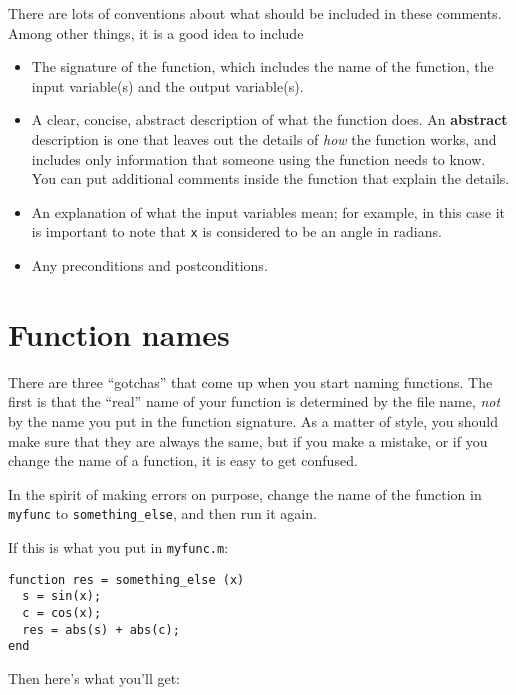 There are lots of conventions about what should be included
in these comments. Among other things, it is a good idea to
include

\begin{itemize}

\item The signature of the function, which includes the name
of the function, the input variable(s) and the output variable(s).

\item A clear, concise, abstract description of what the function does.
An {\bf abstract} description is one that leaves out the
details of {\em how} the function works, and includes only information
that someone using the function needs to know. You can put additional
comments inside the function that explain the details.

\item An explanation of what the input variables mean; for example,
in this case it is important to note that {\tt x} is considered
to be an angle in radians.

\item Any preconditions and postconditions.

\end{itemize}



\section{Function names}

There are three ``gotchas'' that come up when you start naming
functions. The first is that the ``real'' name of your function
is determined by the file name, {\em not} by the name
you put in the function signature. As a matter of style, you
should make sure that they are always the same, but if you
make a mistake, or if you change the name of a function, it is
easy to get confused.

In the spirit of making errors on purpose, change the name of
the function in {\tt myfunc} to {\tt something\_else}, and
then run it again.

If this is what you put in {\tt myfunc.m}:

\begin{verbatim}
function res = something_else (x)
  s = sin(x);
  c = cos(x);
  res = abs(s) + abs(c);
end
\end{verbatim}

Then here's what you'll get:

